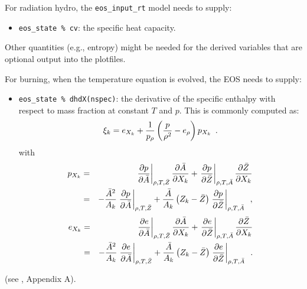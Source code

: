 For radiation hydro, the {\tt eos\_input\_rt} model needs to supply:
\begin{itemize}
  \item {\tt eos\_state \% cv}: the specific heat capacity.
\end{itemize}
Other quantities (e.g., entropy) might be needed for the derived
variables that are optional output into the plotfiles.

For burning, when the temperature equation is evolved, the EOS
needs to supply:
\begin{itemize}
\item {\tt eos\_state \% dhdX(nspec)}: the derivative of the
  specific enthalpy with respect to mass fraction at constant
  $T$ and $p$.  This is commonly computed as:
  \begin{equation}
    \xi_k = e_{X_k} + \frac{1}{p_\rho} \left (\frac{p}{\rho^2} - e_\rho \right ) p_{X_k}\enskip .
  \end{equation}
  with
  \begin{eqnarray}
p_{X_k} &=& \left .\frac{\partial p}{\partial \bar{A}} \right |_{\rho, T, \bar{Z}}
          \frac{\partial \bar{A}}{\partial X_k} +
          \left . \frac{\partial p}{\partial \bar{Z}} \right |_{\rho, T, \bar{A}}
          \frac{\partial \bar{Z}}{\partial X_k} \nonumber \\
        &=& -\frac{\bar{A}^2}{A_k}
          \left .\frac{\partial p}{\partial \bar{A}} \right |_{\rho, T, \bar{Z}} +
          \frac{\bar{A}}{A_k} \left (Z_k - \bar{Z} \right )
          \left . \frac{\partial p}{\partial \bar{Z}} \right |_{\rho, T, \bar{A}}\enskip,
\end{eqnarray}
\begin{eqnarray}
e_{X_k} &=& \left . \frac{\partial e }{\partial \bar{A}} \right |_{\rho, T, \bar{Z}}
        \frac{\partial \bar{A}}{\partial X_k} +
        \left .\frac{\partial e}{\partial \bar{Z}} \right |_{\rho, T, \bar{A}}
        \frac{\partial \bar{Z}}{\partial X_k} \nonumber \\
        &=& -\frac{\bar{A}^2}{A_k}
        \left . \frac{\partial e }{\partial \bar{A}} \right |_{\rho, T, \bar{Z}} +
        \frac{\bar{A}}{A_k} \left (Z_k - \bar{Z}\right )
        \left .\frac{\partial e}{\partial \bar{Z}} \right |_{\rho, T, \bar{A}}\enskip.
\end{eqnarray}
\end{itemize}
(see \cite{maestro:III}, Appendix A).

